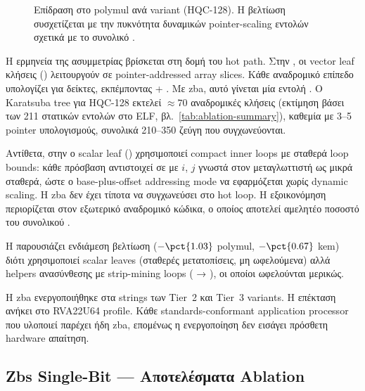 \begin{figure}[htbp]
  \centering
  
  \caption[Επίδραση Zba στο polymul instret ανά variant (HQC-128)]{Επίδραση  στο polymul \instret ανά variant (HQC-128).
    Η βελτίωση συσχετίζεται με την πυκνότητα δυναμικών pointer-scaling
    εντολών σχετικά με το συνολικό \instret.}
  \label{fig:zba-ablation}
\end{figure}

Η ερμηνεία της ασυμμετρίας βρίσκεται στη δομή του hot path. Στην
, οι vector leaf κλήσεις ()
λειτουργούν σε pointer-addressed array slices. Κάθε αναδρομικό επίπεδο
υπολογίζει  για  δείκτες, εκπέμποντας
 + . Με \gls{zba}, αυτό
γίνεται μία εντολή . Ο Karatsuba tree για HQC-128 εκτελεί
$\approx 70$ αναδρομικές κλήσεις (εκτίμηση βάσει των \num{211} στατικών
 εντολών στο ELF, βλ.\ \cref{tab:ablation-summary}), καθεμία με 3–5 pointer υπολογισμούς, συνολικά 210–350 ζεύγη  που συγχωνεύονται.

Αντίθετα, στην  ο scalar leaf ()
χρησιμοποιεί compact inner loops με σταθερά loop bounds: κάθε πρόσβαση
αντιστοιχεί σε  με $i$, $j$ γνωστά στον μεταγλωττιστή ως
μικρά σταθερά, ώστε ο base-plus-offset addressing mode να εφαρμόζεται
χωρίς dynamic scaling. Η \gls{zba} δεν έχει τίποτα να συγχωνεύσει στο
hot loop. Η εξοικονόμηση περιορίζεται στον εξωτερικό αναδρομικό κώδικα,
ο οποίος αποτελεί αμελητέο ποσοστό του συνολικού \instret.

Η  παρουσιάζει ενδιάμεση βελτίωση ($-\pct{1.03}$
polymul, $-\pct{0.67}$ \gls{kem}) διότι χρησιμοποιεί scalar \clmul leaves
(σταθερές μετατοπίσεις, μη ωφελούμενα) αλλά \RVV helpers ανασύνθεσης με strip-mining loops ( → ), οι οποίοι
ωφελούνται μερικώς.

Η \gls{zba} ενεργοποιήθηκε στα  strings των Tier~2 και
Tier~3 variants. Η επέκταση ανήκει στο RVA22U64 profile. Κάθε
standards-conformant application processor που υλοποιεί \RVV παρέχει
ήδη \gls{zba}, επομένως η ενεργοποίηση δεν εισάγει πρόσθετη hardware
απαίτηση.

\subsection{Zbs Single-Bit — Αποτελέσματα Ablation}
\label{ssec:zbs-ablation}

